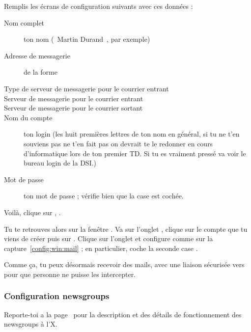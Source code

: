 Remplis les écrans de configuration suivants avec ces données :
\begin{description}
  \item[Nom complet] ton nom (\guillemotleft~Martin Durand~\guillemotright , par exemple)
  \item[Adresse de messagerie] de la forme 
  \item[Type de serveur de messagerie pour le courrier entrant] 
  \item[Serveur de messagerie pour le courrier entrant] 
  \item[Serveur de messagerie pour le courrier sortant] 
  \item[Nom du compte] ton login  (les huit premières lettres de ton nom en général, si tu ne t'en souviens pas ne t'en fait pas on devrait te le redonner en cours d'informatique lors de ton premier TD. Si tu es vraiment pressé va voir le bureau login de la DSI.)
  \item[Mot de passe] ton mot de passe  ;
       vérifie bien que la case  est cochée.
\end{description}

Voilà, clique sur , .

Tu te retrouves alors sur la fenêtre . Va sur
l'onglet , clique sur le compte que tu viens de créer
puis sur . Clique sur l'onglet  et
configure comme sur la capture~\ref{config:win:mail} ; en
particulier, coche la seconde case .

Comme \c{c}a, tu peux désormais recevoir des mails, avec une liaison
sécurisée vers  pour que personne ne puisse les
intercepter.



\subsubsection{Configuration newsgroups}
Reporte-toi a la page~\pageref{newsgroups} pour la description et des détails de fonctionnement des newsgroups à l'X.

